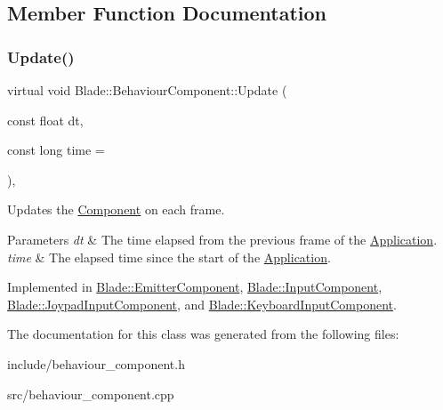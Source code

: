 \subsection{Member Function Documentation}
\mbox{\label{class_blade_1_1_behaviour_component_a90ec3079534ea1f7225c676881b30c17}} 
\subsubsection{\texorpdfstring{Update()}{Update()}}
{\footnotesize\ttfamily virtual void Blade\+::\+Behaviour\+Component\+::\+Update (\begin{DoxyParamCaption}\item[{const float}]{dt,  }\item[{const long}]{time = {} }\end{DoxyParamCaption})\hspace{0.3cm}{\ttfamily [pure virtual]}, {\ttfamily [noexcept]}}



Updates the \hyperlink{class_blade_1_1_component}{Component} on each frame. 


\begin{DoxyParams}{Parameters}
{\em dt} & The time elapsed from the previous frame of the \hyperlink{class_blade_1_1_application}{Application}. \\
\hline
{\em time} & The elapsed time since the start of the \hyperlink{class_blade_1_1_application}{Application}. \\
\hline
\end{DoxyParams}


Implemented in \hyperlink{class_blade_1_1_emitter_component_ac9fe8dec74fec5c575b960cc9d1411ac}{Blade\+::\+Emitter\+Component}, \hyperlink{class_blade_1_1_input_component_aa7869b52200bb0a8c0c304fdf6147098}{Blade\+::\+Input\+Component}, \hyperlink{class_blade_1_1_joypad_input_component_a386bea7c84d17eefa0d40bfa17575e04}{Blade\+::\+Joypad\+Input\+Component}, and \hyperlink{class_blade_1_1_keyboard_input_component_a0945515e8c0513eaa5b536fd4cb2022c}{Blade\+::\+Keyboard\+Input\+Component}.



The documentation for this class was generated from the following files\+:\begin{DoxyCompactItemize}
\item 
include/behaviour\+\_\+component.\+h\item 
src/behaviour\+\_\+component.\+cpp\end{DoxyCompactItemize}
